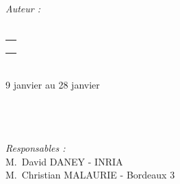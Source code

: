 \begin{titlepage}
\begin{flushleft} 
  \large
  \emph{Auteur :}\\
  \reportauthor\\
\end{flushleft}
\begin{center}
  
  \begin{center}
    \begin{tabular}{c}
      \\
      \\
      \\
      \\
    \end{tabular}
    
    
      
    \textsc{\Large \reportsubject}\\[0.5cm]
           {\large 9 janvier au 28 janvier}\\
           
           
           \HRule \\[0.4cm]
                  {\huge \bfseries \reporttitle}\\[0.4cm]
                  \HRule \\[1.5cm]
                  
                  \begin{center}
                    
                    
                    
                    
                  
                  
                  
                  
                  
  \end{center}    
\end{center}
\begin{flushbottom}
\begin{flushright} 
  \large
  \emph{Responsables :} \\
  M.~David DANEY - \small{INRIA} \\
  M.~Christian MALAURIE - \small{Bordeaux 3}
\end{flushright}
\end{flushbottom}
\end{center}
\end{titlepage}
